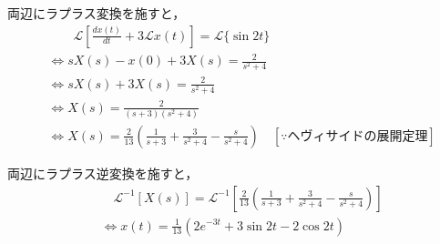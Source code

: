 \documentclass[a4paper,12pt]{article}
\begin{document}
\begin{tcolorbox}[title={[14] つぎの微分方程式をラプラス変換を用いて解け．\\
  \[
  \frac{dx(t)}{dt} + 3x(t) = sin{2t}
  \]
  
  \quad ただし，初期条件は，$x(0)=0$ とする． }]

  \quad 両辺にラプラス変換を施すと，
  \begin{align*}
      &\qquad \mathcal{L}\left[\frac{dx(t)}{dt} + 3\mathcal{L} x(t)\right] = \mathcal{L}\{\sin 2t\} \\
      &\Leftrightarrow sX(s) - x(0) + 3X(s) = \frac{2}{s^2 + 4} \\
      &\Leftrightarrow sX(s) + 3X(s) = \frac{2}{s^2 + 4} \\
      &\Leftrightarrow X(s) = \frac{2}{(s+3)(s^2 + 4)}  \\
      &\Leftrightarrow X(s)= \frac{2}{13} \left( \frac{1}{s+3} + \frac{3}{s^2 + 4} - \frac{s}{s^2 + 4} \right) 
      \quad \left[ \because ヘヴィサイドの展開定理 \right]
  \end{align*}
      
  \quad 両辺にラプラス逆変換を施すと，
  \vspace{-3mm}
  \begin{align*}
  &\quad \mathcal{L}^{-1} \left[ X(s) \right] 
  = \mathcal{L}^{-1} \left[ \frac{2}{13} \left( \frac{1}{s+3} + \frac{3}{s^2 + 4} - \frac{s}{s^2 + 4} \right) \right] \\
  &\Leftrightarrow x(t) = \frac{1}{13} \left( 2e^{-3t} + 3\sin 2t - 2\cos 2t \right)
  \end{align*}
  


\vspace{2mm}
  \end{tcolorbox}
\end{document}
